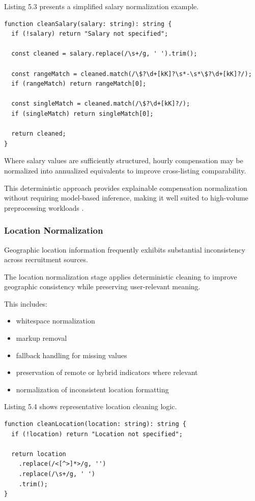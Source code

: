 Listing 5.3 presents a simplified salary normalization example.

\begin{lstlisting}[caption={Salary normalization logic}]
function cleanSalary(salary: string): string {
  if (!salary) return "Salary not specified";

  const cleaned = salary.replace(/\s+/g, ' ').trim();

  const rangeMatch = cleaned.match(/\$?\d+[kK]?\s*-\s*\$?\d+[kK]?/);
  if (rangeMatch) return rangeMatch[0];

  const singleMatch = cleaned.match(/\$?\d+[kK]?/);
  if (singleMatch) return singleMatch[0];

  return cleaned;
}
\end{lstlisting}

Where salary values are sufficiently structured, hourly compensation may be normalized into annualized equivalents to improve cross-listing comparability.

This deterministic approach provides explainable compensation normalization without requiring model-based inference, making it well suited to high-volume preprocessing workloads \cite{sarawagi2008information}.

\subsubsection*{Location Normalization}

Geographic location information frequently exhibits substantial inconsistency across recruitment sources.

The location normalization stage applies deterministic cleaning to improve geographic consistency while preserving user-relevant meaning.

This includes:
\begin{itemize}[leftmargin=1.4em,itemsep=0.25em,topsep=0.25em]
\item whitespace normalization
\item markup removal
\item fallback handling for missing values
\item preservation of remote or hybrid indicators where relevant
\item normalization of inconsistent location formatting
\end{itemize}
Listing 5.4 shows representative location cleaning logic.

\begin{lstlisting}[caption={Location normalization logic}]
function cleanLocation(location: string): string {
  if (!location) return "Location not specified";

  return location
    .replace(/<[^>]*>/g, '')
    .replace(/\s+/g, ' ')
    .trim();
}
\end{lstlisting}

